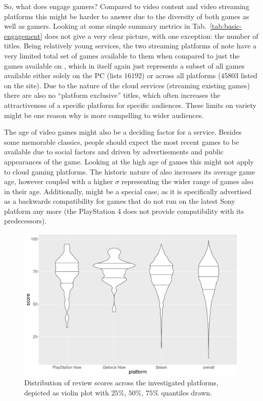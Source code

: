 So, what does engage gamers? Compared to video content and video streaming platforms this might be harder to answer due to the diversity of both games as well as gamers. Looking at some simple summary metrics in Tab.~\ref{tab:basic-engagement} does not give a very clear picture, with one exception: the number of titles. Being relatively young services, the two streaming platforms of note have a very limited total set of games available to them when compared to just the games available on \steam, which in itself again just represents a subset of all games available either solely on the PC (\metacritic lists $16192$) or across all platforms ($45803$ listed on the site). Due to the nature of the cloud services (streaming existing games) there are also no ``platform exclusive'' titles, which often increases the attractiveness of a specific platform for specific audiences. These limits on variety might be one reason why \steam is more compelling to wider audiences.

The age of video games might also be a deciding factor for a service. Besides some memorable classics, people should expect the most recent games to be available due to social factors and driven by advertisements and public appearances of the game. Looking at the high age of games this might not apply to cloud gaming platforms. The historic nature of \steam also increases its average game age, however coupled with a higher $\sigma$ representing the wider range of games also in their age. Additionally, \psnow might be a special case, as it is specifically advertised as a backwards compatibility for games that do not run on the latest Sony platform any more (the PlayStation 4 does not provide compatibility with its predecessors).






\begin{figure}[!t]
	\centering
	\includegraphics[width=1.0\columnwidth]{images/scores-by-platform-violin.pdf}
	\caption{Distribution of review scores across the investigated platforms, depicted as violin plot with $25\%$, $50\%$, $75\%$ quantiles drawn.}
\label{fig:scores-by-platform}
\end{figure}





